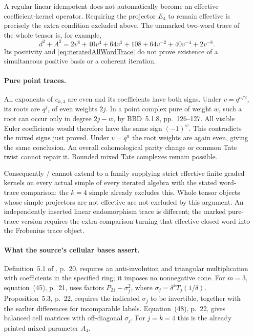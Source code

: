 A regular linear idempotent does not automatically become
an effective coefficient-kernel operator. Requiring the
projector \(E_4\) to remain effective is precisely the
extra condition excluded above. The unmarked two-word
trace of the whole tensor is, for example,
\[
 d^2+A^2
 =2v^8+40v^4+64v^2+108+64v^{-2}+40v^{-4}+2v^{-8}.
\]
Its positivity and \eqref{eq:iteratedAllWordTrace} do not
prove existence of a simultaneous positive basis or a
coherent iteration.

\paragraph{Pure point traces.}
All exponents of \(c_{k,4}\) are even and its coefficients
have both signs. Under \(v=q^{n/2}\), its roots are
\(q^j\), of even weights \(2j\). In a point complex
pure of weight \(w\), such a root can occur only in
degree \(2j-w\), by BBD~5.1.8, pp.~126--127.
All visible Euler coefficients would therefore have
the same sign \((-1)^w\). This contradicts the mixed
signs just proved. Under \(v=q^n\) the root weights
are again even, giving the same conclusion.
An overall cohomological parity change or common Tate
twist cannot repair it. Bounded mixed Tate complexes
remain possible.

Consequently / cannot extend to a
family supplying strict effective finite graded kernels
on every actual simple of every iterated algebra with
the stated word-trace comparison: the \(k=4\) simple
already excludes this. Whole tensor objects whose simple
projectors are not effective are not excluded by this
argument. An independently inserted linear endomorphism
trace is different; the marked pure-trace version
requires the extra comparison turning that effective
closed word into the Frobenius trace object.

\paragraph{What the source's cellular bases assert.}
Definition~5.1 of \cite{BlasiakChebyshev}, p.~20,
requires an anti-involution and triangular multiplication
with coefficients in the specified ring; it imposes no
nonnegative cone.
For \(m=3\), equation~(45), p.~21, uses factors
\(P_{21}-\sigma_j^2\), where
\(\sigma_j=\delta^kT_j(1/\delta)\).
Proposition~5.3, p.~22, requires the indicated
\(\sigma_j\) to be invertible, together with the
earlier differences for incomparable labels.
Equation~(48), p.~22, gives balanced cell matrices
with off-diagonal \(\sigma_j\).
For \(j=k=4\) this is the already printed mixed
parameter \(A_4\).


